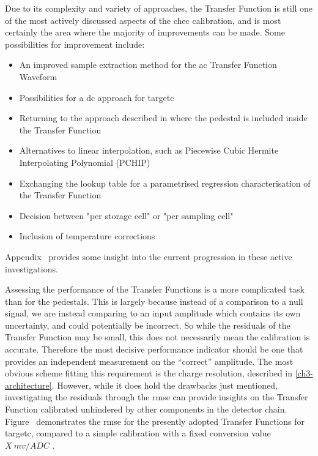 Due to its complexity and variety of approaches, the Transfer Function is still one of the most actively discussed aspects of the \gls{chec} calibration, and is most certainly the area where the majority of improvements can be made. Some possibilities for improvement include:
\begin{itemize}
	\item An improved sample extraction method for the \gls{ac} Transfer Function Waveform
	\item Possibilities for a \gls{dc} approach for \gls{targetc}
	\item Returning to the approach described in \cite{Albert2017} where the pedestal is included inside the Transfer Function
	\item Alternatives to linear interpolation, such as Piecewise Cubic Hermite Interpolating Polynomial (PCHIP)
	\item Exchanging the lookup table for a parametrised regression characterisation of the Transfer Function
	\item Decision between "per storage cell" or "per sampling cell"
	\item Inclusion of temperature corrections
\end{itemize}
Appendix~ provides some insight into the current progression in these active investigations.

Assessing the performance of the Transfer Functions is a more complicated task than for the pedestals. This is largely because instead of a comparison to a null signal, we are instead comparing to an input amplitude which contains its own uncertainty, and could potentially be incorrect. So while the residuals of the Transfer Function may be small, this does not necessarily mean the calibration is accurate. Therefore the most decisive performance indicator should be one that provides an independent measurement on the ``correct'' amplitude. The most obvious scheme fitting this requirement is the charge resolution, described in \ref{ch3-architecture}. However, while it does hold the drawbacks just mentioned, investigating the residuals through the \gls{rmse} can provide insights on the Transfer Function calibrated unhindered by other components in the detector chain. Figure~ demonstrates the \gls{rmse} for the presently adopted Transfer Functions for \gls{targetc}, compared to a simple calibration with a fixed conversion value $X~mv/ADC$ .

